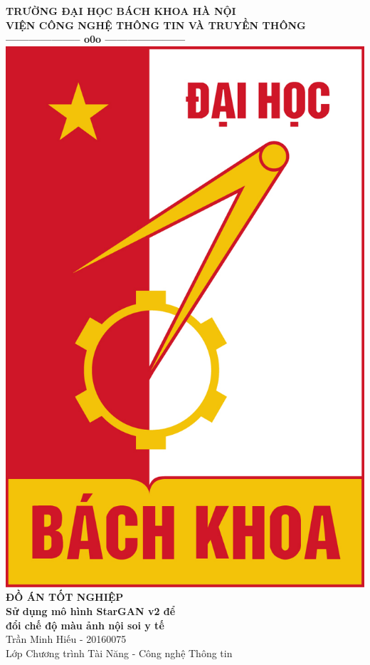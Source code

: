 \documentclass[12pt]{extreport}
\begin{document}
\thispagestyle{empty}
\thisfancypage{
    \setlength{\fboxsep}{0pt}
    \fbox}{}

\begin{center}
    {\fontsize{13pt}{1}\selectfont\textbf{TRƯỜNG ĐẠI HỌC BÁCH KHOA HÀ NỘI}}
    \\
    {\fontsize{13pt}{1}\selectfont\textbf{VIỆN CÔNG NGHỆ THÔNG TIN VÀ TRUYỀN THÔNG}}
    \\
    \textbf{--------------------  o0o  ---------------------}\\[1cm]
    \includegraphics[scale=0.5]{bk-rgb.jpg} \\[1.2cm]
    \textbf{\large{ĐỒ ÁN TỐT NGHIỆP}}\\[1cm]
    \textbf{\large{Sử dụng mô hình StarGAN v2 để \\ đổi chế độ màu ảnh nội soi y tế}}\\[1cm]
    Trần Minh Hiếu - 20160075 \\
    Lớp Chương trình Tài Năng - Công nghệ Thông tin
\end{center}
\end{document}
